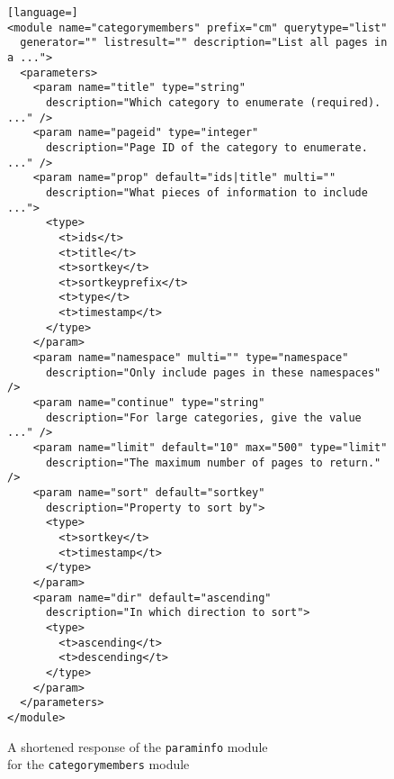 \begin{figure}[p]

\begin{lstlisting}[language=]
<module name="categorymembers" prefix="cm" querytype="list"
  generator="" listresult="" description="List all pages in a ...">
  <parameters>
    <param name="title" type="string" 
      description="Which category to enumerate (required). ..." />
    <param name="pageid" type="integer" 
      description="Page ID of the category to enumerate. ..." />
    <param name="prop" default="ids|title" multi=""
      description="What pieces of information to include ...">
      <type>
        <t>ids</t>
        <t>title</t>
        <t>sortkey</t>
        <t>sortkeyprefix</t>
        <t>type</t>
        <t>timestamp</t>
      </type>
    </param>
    <param name="namespace" multi="" type="namespace"
      description="Only include pages in these namespaces" />
    <param name="continue" type="string"
      description="For large categories, give the value ..." />
    <param name="limit" default="10" max="500" type="limit" 
      description="The maximum number of pages to return." />
    <param name="sort" default="sortkey"
      description="Property to sort by">
      <type>
        <t>sortkey</t>
        <t>timestamp</t>
      </type>
    </param>
    <param name="dir" default="ascending"
      description="In which direction to sort">
      <type>
        <t>ascending</t>
        <t>descending</t>
      </type>
    </param>
  </parameters>
</module>
\end{lstlisting}

\caption{A shortened response of the \texttt{paraminfo} module \\ for the \texttt{categorymembers} module}
\label{paraminfo sample}
\end{figure}